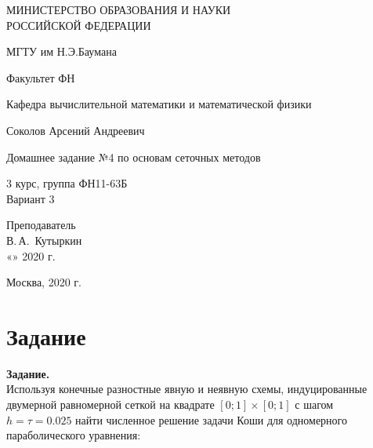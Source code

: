 \documentclass[14pt,a4paper]{scrartcl}
\begin{document}
	\begin{titlepage}
	\begin{center}
		\large
		МИНИСТЕРСТВО ОБРАЗОВАНИЯ И НАУКИ\\ РОССИЙСКОЙ ФЕДЕРАЦИИ
		
		\vspace{0.5cm}
		
		МГТУ им Н.Э.Баумана
		\vspace{0.25cm}
		
		Факультет ФН
		
		Кафедра вычислительной математики и математической физики
		\vfill
		
		
		Соколов Арсений Андреевич\\
		\vfill
		
		
		{\LARGE Домашнее задание №4 по основам сеточных методов \\[2mm]
		}
		\bigskip
		
		3 курс, группа ФН11-63Б\\
		Вариант 3
	\end{center}
	\vfill
	
	\newlength{\ML}
	\hfill\begin{minipage}{0.4\textwidth}
		Преподаватель\\
		\underline{\hspace{3cm}} В.\,А.~Кутыркин\\
		«\underline{\hspace{0.7cm}}» \underline{\hspace{1.71cm}} 2020 г.
	\end{minipage}%
	\bigskip
	
	
	\vfill
	
	\begin{center}
		Москва, 2020 г.
	\end{center}
\end{titlepage}

\section*{Задание}
\textbf{Задание.}\\

Используя конечные разностные явную и неявную схемы, индуцированные двумерной равномерной сеткой на квадрате $[0;1]\times[0;1]$ с шагом $h = \tau = 0.025$ найти численное решение задачи Коши для одномерного параболического уравнения:
\end{document}
